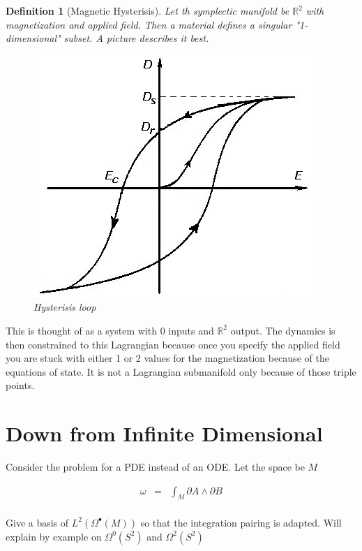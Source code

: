 \documentclass[a4paper,landscape]{article}
\theoremstyle{change}
\newtheorem{definition}[equation]{Definition}
\theoremstyle{nonumberplain}
\numberwithin{equation}{section}
\begin{document}
\begin{definition}[Magnetic Hysterisis]
Let th symplectic manifold be $\mathbb{R}^2$ with magnetization and applied field. Then a material defines a singular "1-dimensional" subset. A picture describes it best.

\begin{figure}[htb!]
\centering
\includegraphics[scale=.2]{Hysteresis.png}
\caption{Hysterisis loop}
\end{figure}

\end{definition}

This is thought of as a system with 0 inputs and $\mathbb{R}^2$ output. The dynamics is then constrained to this Lagrangian because once you specify the applied field you are stuck with either 1 or 2 values for the magnetization because of the equations of state. It is not a Lagrangian submanifold only because of those triple points.

\section{Down from Infinite Dimensional}

Consider the problem for a PDE instead of an ODE. Let the space be $M$

\begin{eqnarray*}
\omega &=& \int_M \partial A \wedge \partial B\\
\end{eqnarray*}

Give a basis of $L^2 ( \Omega^\bullet (M))$ so that the integration pairing is adapted. Will explain by example on $\Omega^0 (S^2)$ and $\Omega^2 (S^2)$
\end{document}

